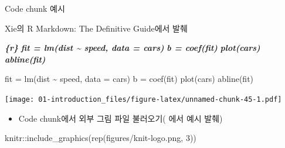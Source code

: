 \documentclass[
  11pt,
]{krantz}
\newenvironment{Shaded}{\begin{snugshade}}{\end{snugshade}}
\newcommand{\AttributeTok}[1]{\textcolor[rgb]{0.61,0.61,0.61}{#1}}
\newcommand{\DecValTok}[1]{\textcolor[rgb]{0.06,0.06,0.06}{#1}}
\newcommand{\FunctionTok}[1]{\textcolor[rgb]{0,0,0}{#1}}
\newcommand{\InformationTok}[1]{\textcolor[rgb]{0.37,0.37,0.37}{\textbf{\textit{#1}}}}
\newcommand{\NormalTok}[1]{#1}
\newcommand{\OtherTok}[1]{\textcolor[rgb]{0.37,0.37,0.37}{#1}}
\newcommand{\SpecialCharTok}[1]{\textcolor[rgb]{0,0,0}{#1}}
\newcommand{\StringTok}[1]{\textcolor[rgb]{0.5,0.5,0.5}{#1}}
\providecommand{\tightlist}{%
  \setlength{\itemsep}{0pt}\setlength{\parskip}{0pt}}
\begin{document}
\begin{Shaded}
\begin{Highlighting}[]
\NormalTok{Code chunk 예시}

\NormalTok{Xie의 R Markdown: The Definitive Guide에서 발췌}

\InformationTok{\textasciigrave{}\textasciigrave{}\textasciigrave{}\{r\}}
\InformationTok{fit = lm(dist \textasciitilde{} speed, data = cars)}
\InformationTok{b   = coef(fit)}
\InformationTok{plot(cars)}
\InformationTok{abline(fit)}
\InformationTok{\textasciigrave{}\textasciigrave{}\textasciigrave{}}
\end{Highlighting}
\end{Shaded}

\footnotesize

\begin{Shaded}
\begin{Highlighting}[]
\NormalTok{fit }\OtherTok{=} \FunctionTok{lm}\NormalTok{(dist }\SpecialCharTok{\textasciitilde{}}\NormalTok{ speed, }\AttributeTok{data =}\NormalTok{ cars)}
\NormalTok{b   }\OtherTok{=} \FunctionTok{coef}\NormalTok{(fit)}
\FunctionTok{plot}\NormalTok{(cars)}
\FunctionTok{abline}\NormalTok{(fit)}
\end{Highlighting}
\end{Shaded}

\texttt{[image: 01-introduction\_files/figure-latex/unnamed-chunk-45-1.pdf]}

\normalsize

\begin{itemize}
\tightlist
\item
  Code chunk에서 외부 그림 파일 불러오기(\citet{xie-2018} 에서 예시 발췌)
\end{itemize}

\footnotesize

\begin{Shaded}
\begin{Highlighting}[]
\NormalTok{knitr}\SpecialCharTok{::}\FunctionTok{include\_graphics}\NormalTok{(}\FunctionTok{rep}\NormalTok{(}\StringTok{\textquotesingle{}figures/knit{-}logo.png\textquotesingle{}}\NormalTok{, }\DecValTok{3}\NormalTok{))}
\end{Highlighting}
\end{Shaded}
\end{document}
